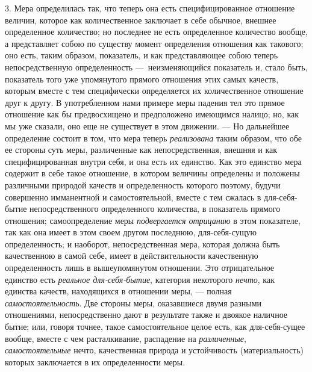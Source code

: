 3. Мера определилась так, что теперь она есть специфицированное отношение
величин, которое как количественное заключает в себе обычное, внешнее
определенное количество; но последнее не есть определенное количество
вообще, а представляет собою по существу момент определения отношения как
такового; оно есть, таким образом, показатель, и как представляющее собою
теперь непосредственную определенность —~неизменяющийся показатель и, стало
быть, показатель того уже упомянутого прямого отношения этих самых качеств,
которым вместе с тем специфически определяется их количественное отношение
друг к другу. В употребленном нами примере меры падения тел это прямое
отношение как бы предвосхищено и предположено имеющимся налицо; но, как мы
уже сказали, оно еще не существует в этом движении. — Но дальнейшее
определение состоит в том, что мера теперь
{\em реализована} таким образом, что обе ее стороны
суть меры, различенные как непосредственная, внешняя и как
специфицированная внутри себя, и она есть их единство. Как это единство
мера содержит в себе такое отношение, в котором величины определены и
положены различными природой качеств и определенность которого поэтому,
будучи совершенно имманентной и самостоятельной, вместе с тем сжалась в
для-себя-бытие непосредственного определенного количества, в показатель
прямого отношения; самоопределение меры
{\em подвергается отрицанию} в этом показателе, так как
она имеет в этом своем другом последнюю, для-себя-сущую определенность; и
наоборот, непосредственная мера, которая должна быть качественною в самой
себе, имеет в действительности качественную определенность лишь в
вышеупомянутом отношении. Это отрицательное единство есть
{\em реальное для-себя-бытие}, категория некоторого
{\em нечто}, как единства качеств, находящихся в
отношении меры, — полная {\em самостоятельность}. Две
стороны меры, оказавшиеся двумя разными отношениями, непосредственно дают в
результате также и двоякое наличное бытие; или, говоря точнее, такое
самостоятельное целое есть, как для-себя-сущее вообще, вместе с чем
расталкивание, распадение на {\em различенные},
{\em самостоятельные} нечто, качественная природа и
устойчивость (материальность) которых заключается в их определенности меры.

